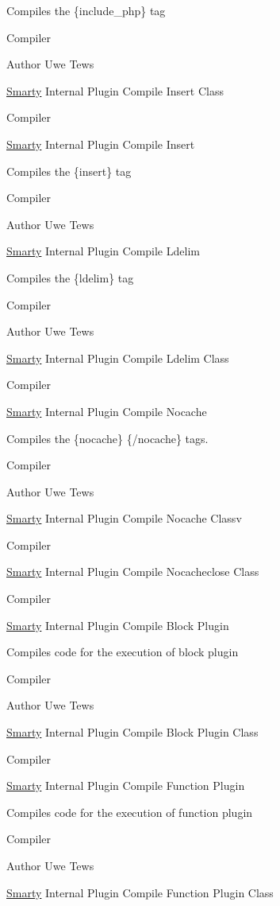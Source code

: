 Compiles the \{include\+\_\+php\} tag

Compiler \begin{DoxyAuthor}{Author}
Uwe Tews
\end{DoxyAuthor}
\hyperlink{class_smarty}{Smarty} Internal Plugin Compile Insert Class

Compiler

\hyperlink{class_smarty}{Smarty} Internal Plugin Compile Insert

Compiles the \{insert\} tag

Compiler \begin{DoxyAuthor}{Author}
Uwe Tews
\end{DoxyAuthor}
\hyperlink{class_smarty}{Smarty} Internal Plugin Compile Ldelim

Compiles the \{ldelim\} tag

Compiler \begin{DoxyAuthor}{Author}
Uwe Tews
\end{DoxyAuthor}
\hyperlink{class_smarty}{Smarty} Internal Plugin Compile Ldelim Class

Compiler

\hyperlink{class_smarty}{Smarty} Internal Plugin Compile Nocache

Compiles the \{nocache\} \{/nocache\} tags.

Compiler \begin{DoxyAuthor}{Author}
Uwe Tews
\end{DoxyAuthor}
\hyperlink{class_smarty}{Smarty} Internal Plugin Compile Nocache Classv

Compiler

\hyperlink{class_smarty}{Smarty} Internal Plugin Compile Nocacheclose Class

Compiler

\hyperlink{class_smarty}{Smarty} Internal Plugin Compile Block Plugin

Compiles code for the execution of block plugin

Compiler \begin{DoxyAuthor}{Author}
Uwe Tews
\end{DoxyAuthor}
\hyperlink{class_smarty}{Smarty} Internal Plugin Compile Block Plugin Class

Compiler

\hyperlink{class_smarty}{Smarty} Internal Plugin Compile Function Plugin

Compiles code for the execution of function plugin

Compiler \begin{DoxyAuthor}{Author}
Uwe Tews
\end{DoxyAuthor}
\hyperlink{class_smarty}{Smarty} Internal Plugin Compile Function Plugin Class

